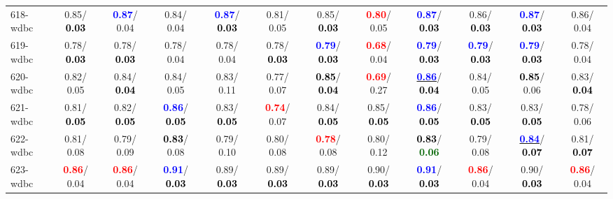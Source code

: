 \begin{table}[h]
\begin{center}
{\begin{tabular}{lc|c|c|c|c|c|c|c|c|c|c}
618-wdbc &   0.85/\textcolor{black}{\textbf{  0.03}} & \textcolor{blue}{\textbf{  0.87}}/  0.04 &   0.84/  0.04 & \textcolor{blue}{\textbf{  0.87}}/\textcolor{black}{\textbf{  0.03}} &   0.81/  0.05 &   0.85/\textcolor{black}{\textbf{  0.03}} & \textcolor{red}{\textbf{  0.80}}/  0.05 & \textcolor{blue}{\textbf{  0.87}}/\textcolor{black}{\textbf{  0.03}} &   0.86/\textcolor{black}{\textbf{  0.03}} & \textcolor{blue}{\textbf{  0.87}}/\textcolor{black}{\textbf{  0.03}} &   0.86/  0.04 \\
619-wdbc &   0.78/\textcolor{black}{\textbf{  0.03}} &   0.78/\textcolor{black}{\textbf{  0.03}} &   0.78/  0.04 &   0.78/  0.04 &   0.78/\textcolor{black}{\textbf{  0.03}} & \textcolor{blue}{\textbf{  0.79}}/\textcolor{black}{\textbf{  0.03}} & \textcolor{red}{\textbf{  0.68}}/  0.04 & \textcolor{blue}{\textbf{  0.79}}/\textcolor{black}{\textbf{  0.03}} & \textcolor{blue}{\textbf{  0.79}}/\textcolor{black}{\textbf{  0.03}} & \textcolor{blue}{\textbf{  0.79}}/\textcolor{black}{\textbf{  0.03}} &   0.78/  0.04 \\
620-wdbc &   0.82/  0.05 &   0.84/\textcolor{black}{\textbf{  0.04}} &   0.84/  0.05 &   0.83/  0.11 &   0.77/  0.07 & \textcolor{black}{\textbf{  0.85}}/\textcolor{black}{\textbf{  0.04}} & \textcolor{red}{\textbf{  0.69}}/  0.27 & \underline{\textcolor{blue}{\textbf{  0.86}}}/\textcolor{black}{\textbf{  0.04}} &   0.84/  0.05 & \textcolor{black}{\textbf{  0.85}}/  0.06 &   0.83/\textcolor{black}{\textbf{  0.04}} \\
621-wdbc &   0.81/\textcolor{black}{\textbf{  0.05}} &   0.82/\textcolor{black}{\textbf{  0.05}} & \textcolor{blue}{\textbf{  0.86}}/\textcolor{black}{\textbf{  0.05}} &   0.83/\textcolor{black}{\textbf{  0.05}} & \textcolor{red}{\textbf{  0.74}}/  0.07 &   0.84/\textcolor{black}{\textbf{  0.05}} &   0.85/\textcolor{black}{\textbf{  0.05}} & \textcolor{blue}{\textbf{  0.86}}/\textcolor{black}{\textbf{  0.05}} &   0.83/\textcolor{black}{\textbf{  0.05}} &   0.83/\textcolor{black}{\textbf{  0.05}} &   0.78/  0.06 \\
622-wdbc &   0.81/  0.08 &   0.79/  0.09 & \textcolor{black}{\textbf{  0.83}}/  0.08 &   0.79/  0.10 &   0.80/  0.08 & \textcolor{red}{\textbf{  0.78}}/  0.08 &   0.80/  0.12 & \textcolor{black}{\textbf{  0.83}}/\textcolor{darkgreen}{\textbf{  0.06}} &   0.79/  0.08 & \underline{\textcolor{blue}{\textbf{  0.84}}}/\textcolor{black}{\textbf{  0.07}} &   0.81/\textcolor{black}{\textbf{  0.07}} \\ \hline
623-wdbc & \textcolor{red}{\textbf{  0.86}}/  0.04 & \textcolor{red}{\textbf{  0.86}}/  0.04 & \textcolor{blue}{\textbf{  0.91}}/\textcolor{black}{\textbf{  0.03}} &   0.89/\textcolor{black}{\textbf{  0.03}} &   0.89/\textcolor{black}{\textbf{  0.03}} &   0.89/\textcolor{black}{\textbf{  0.03}} &   0.90/\textcolor{black}{\textbf{  0.03}} & \textcolor{blue}{\textbf{  0.91}}/\textcolor{black}{\textbf{  0.03}} & \textcolor{red}{\textbf{  0.86}}/  0.04 &   0.90/\textcolor{black}{\textbf{  0.03}} & \textcolor{red}{\textbf{  0.86}}/  0.04 \\

\end{tabular}}
\end{center}
\end{table}

